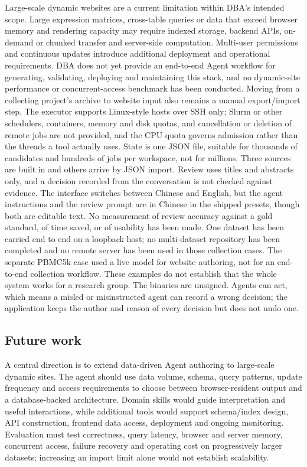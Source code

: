 \documentclass[11pt,a4paper]{article}
\begin{document}
Large-scale dynamic websites are a current limitation within DBA's
intended scope. Large expression matrices, cross-table queries or data
that exceed browser memory and rendering capacity may require indexed
storage, backend APIs, on-demand or chunked transfer and server-side
computation. Multi-user permissions and continuous updates introduce
additional deployment and operational requirements. DBA does not yet
provide an end-to-end Agent workflow for generating, validating,
deploying and maintaining this stack, and no dynamic-site performance
or concurrent-access benchmark has been conducted. Moving from a
collecting project's archive to website input also remains a manual
export/import step. The executor
supports Linux-style hosts over SSH only; Slurm or other schedulers,
containers, memory and disk quotas, and cancellation or deletion of
remote jobs are not provided, and the CPU quota governs admission rather
than the threads a tool actually uses. State is one JSON file, suitable
for thousands of candidates and hundreds of jobs per workspace, not for
millions. Three sources are built in and others arrive by JSON import.
Review uses titles and abstracts only, and a decision recorded from the
conversation is not checked against evidence. The interface switches
between Chinese and English, but the agent instructions and the review
prompt are in Chinese in the shipped presets, though both are editable
text. No measurement of review accuracy against a gold standard, of time
saved, or of usability has been made. One dataset has been carried end
to end on a loopback host; no multi-dataset repository has been
completed and no remote server has been used in those collection cases.
The separate PBMC5k case used a live model for website authoring, not for
an end-to-end collection workflow. These examples do not establish that
the whole system works for a research group. The binaries are unsigned.
Agents can act, which means a misled or misinstructed agent can record a
wrong decision; the application keeps the author and reason of every
decision but does not undo one.

\subsection{Future work}\label{future-work}

A central direction is to extend data-driven Agent authoring to
large-scale dynamic sites. The agent should use data volume, schema,
query patterns, update frequency and access requirements to choose between
browser-resident output and a database-backed architecture. Domain skills
would guide interpretation and useful interactions, while additional tools
would support schema/index design, API construction, frontend data access,
deployment and ongoing monitoring. Evaluation must test correctness,
query latency, browser and server memory, concurrent access, failure
recovery and operating cost on progressively larger datasets; increasing
an import limit alone would not establish scalability.
\end{document}
